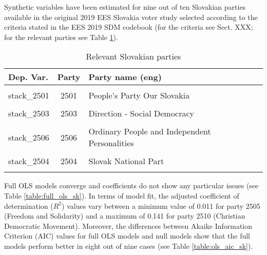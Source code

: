 \documentclass[
]{article}
\begin{document}
Synthetic variables have been estimated for nine out of ten Slovakian parties available in the original
2019 EES Slovakia voter study selected according to the criteria stated in the EES 2019 SDM codebook (for the criteria see Sect. XXX; for the relevant parties see Table \ref{table:relprty_tab_sk}).

\begin{table}[!h]

\caption{\label{tab:unnamed-chunk-155}Relevant Slovakian parties \label{table:relprty_tab_sk}}
\centering
\begin{tabular}[t]{lcl}
\toprule
Dep. Var. & Party & Party name (eng)\\
\midrule
\cellcolor{gray!6}{stack\_2510} & \cellcolor{gray!6}{2510} & \cellcolor{gray!6}{Christian Democratic Movement}\\
stack\_2501 & 2501 & People's Party Our Slovakia\\
\cellcolor{gray!6}{stack\_2509} & \cellcolor{gray!6}{2509} & \cellcolor{gray!6}{We are family}\\
stack\_2503 & 2503 & Direction - Social Democracy\\
\cellcolor{gray!6}{stack\_2505} & \cellcolor{gray!6}{2505} & \cellcolor{gray!6}{Freedom and Solidarity}\\
\addlinespace
stack\_2506 & 2506 & Ordinary People and Independent Personalities\\
\cellcolor{gray!6}{stack\_2508} & \cellcolor{gray!6}{2508} & \cellcolor{gray!6}{Electoral alliance Progressive Slovakia and TOGETHER – Civic Democracy}\\
stack\_2504 & 2504 & Slovak National Part\\
\cellcolor{gray!6}{stack\_2507} & \cellcolor{gray!6}{2507} & \cellcolor{gray!6}{Bridge}\\
\bottomrule
\end{tabular}
\end{table}

Full OLS models converge and coefficients do not show any particular issues (see Table
\ref{table:full_ols_sk}).
In terms of model fit, the adjusted coefficient of determination (\(R^2\)) values vary between
a minimum value of 0.011
for party 2505
(Freedom and Solidarity)
and a maximum of 0.141
for party 2510
(Christian Democratic Movement).
Moreover, the differences between Akaike Information Criterion (AIC) values for full OLS models and null
models show that the full models perform better in eight out of nine cases (see Table \ref{table:ols_aic_sk}).
\end{document}
